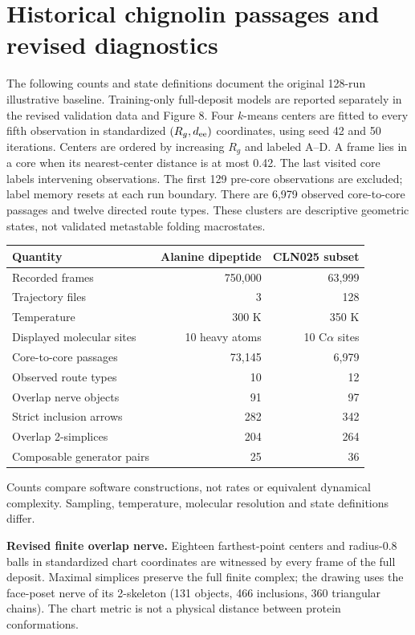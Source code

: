 \newpage
\section*{Historical chignolin passages and revised diagnostics}
The following counts and state definitions document the original 128-run
illustrative baseline. Training-only full-deposit models are reported separately
in the revised validation data and Figure 8.
Four $k$-means centers are fitted to every fifth observation in standardized
$(R_g,d_{\rm ee})$ coordinates, using seed 42 and 50 iterations.
Centers are ordered by increasing $R_g$ and labeled A--D.
A frame lies in a core when its nearest-center distance is at most 0.42.
The last visited core labels intervening observations. The first 129
pre-core observations are excluded; label memory resets at each run boundary.
There are 6,979 observed core-to-core passages and twelve directed route types.
These clusters are descriptive geometric states, not validated metastable
folding macrostates.

\begin{center}\small
\begin{tabular}{lrr}
\toprule Quantity & Alanine dipeptide & CLN025 subset\\\midrule
Recorded frames & 750,000 & 63,999\\
Trajectory files & 3 & 128\\
Temperature & 300 K & 350 K\\
Displayed molecular sites & 10 heavy atoms & 10 C$\alpha$ sites\\
Core-to-core passages & 73,145 & 6,979\\
Observed route types & 10 & 12\\
Overlap nerve objects & 91 & 97\\
Strict inclusion arrows & 282 & 342\\
Overlap 2-simplices & 204 & 264\\
Composable generator pairs & 25 & 36\\\bottomrule
\end{tabular}
\end{center}
Counts compare software constructions, not rates or equivalent dynamical
complexity. Sampling, temperature, molecular resolution and state definitions differ.

\textbf{Revised finite overlap nerve.}
Eighteen farthest-point centers and radius-0.8 balls in standardized chart
coordinates are witnessed by every frame of the full deposit. Maximal
simplices preserve the full finite complex; the drawing uses the face-poset
nerve of its 2-skeleton (131 objects, 466 inclusions, 360 triangular chains).
The chart metric is not a physical distance between protein conformations.

